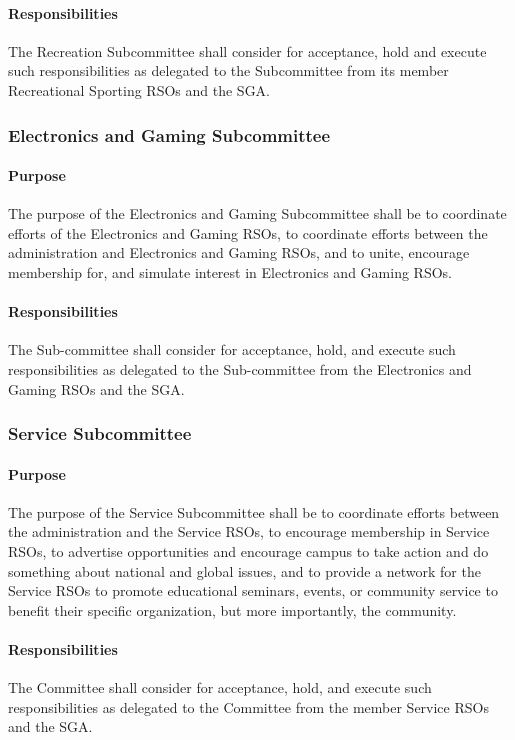 \documentclass[12pt]{scrreprt}
\begin{document}
\paragraph{Responsibilities}
​The Recreation Subcommittee shall consider for acceptance, hold and
execute such responsibilities as delegated to the Subcommittee from its member
Recreational Sporting RSOs and the SGA.

\subsubsection{Electronics and Gaming Subcommittee}

\paragraph{Purpose}
​The purpose of the Electronics and Gaming Subcommittee shall be to
coordinate efforts of the Electronics and Gaming RSOs, to coordinate efforts between the
administration and Electronics and Gaming RSOs, and to unite, encourage membership for,
and simulate interest in Electronics and Gaming RSOs.

\paragraph{Responsibilities}
The Sub-committee shall consider for acceptance, hold, and execute such responsibilities as delegated to the Sub-committee from the Electronics and Gaming RSOs and the SGA.

\subsubsection{Service Subcommittee}

\paragraph{Purpose}
​The purpose of the Service Subcommittee shall be to coordinate efforts
between the administration and the Service RSOs, to encourage membership in Service
RSOs, to advertise opportunities and encourage campus to take action and do something
about national and global issues, and to provide a network for the Service RSOs to promote
educational seminars, events, or community service to benefit their specific organization,
but more importantly, the community.

\paragraph{Responsibilities}
The Committee shall consider for acceptance, hold, and execute such
responsibilities as delegated to the Committee from the member Service
RSOs and the SGA.
\end{document}
